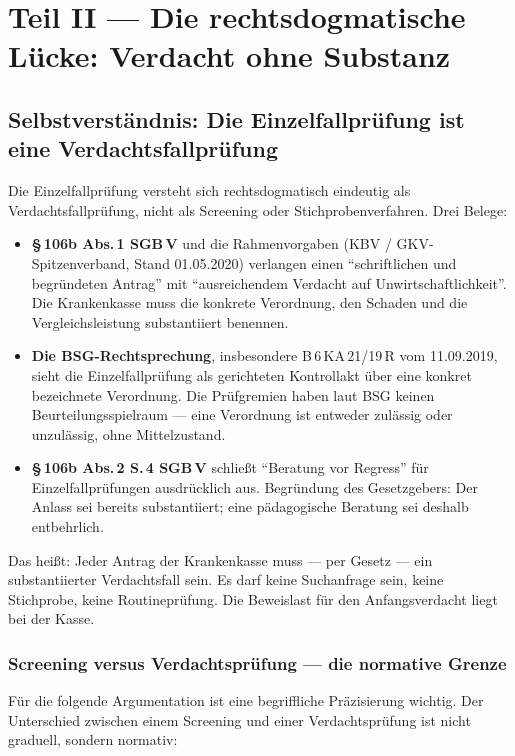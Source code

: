 \documentclass{umbruch-position}
\begin{document}
\section{Teil II --- Die rechtsdogmatische Lücke: Verdacht ohne Substanz}

\subsection{Selbstverständnis: Die Einzelfallprüfung ist eine Verdachtsfallprüfung}

Die Einzelfallprüfung versteht sich rechtsdogmatisch eindeutig als Verdachtsfallprüfung, nicht als Screening oder Stichprobenverfahren. Drei Belege:

\begin{itemize}[nosep]
  \item \textbf{\S\,106b Abs.\,1 SGB\,V} und die Rahmenvorgaben (KBV / GKV-Spitzenverband, Stand 01.05.2020) verlangen einen ``schriftlichen und begründeten Antrag'' mit ``ausreichendem Verdacht auf Unwirtschaftlichkeit''. Die Krankenkasse muss die konkrete Verordnung, den Schaden und die Vergleichsleistung substantiiert benennen.
  \item \textbf{Die BSG-Rechtsprechung}, insbesondere B\,6\,KA\,21/19\,R vom 11.09.2019, sieht die Einzelfallprüfung als gerichteten Kontrollakt über eine konkret bezeichnete Verordnung. Die Prüfgremien haben laut BSG keinen Beurteilungsspielraum --- eine Verordnung ist entweder zulässig oder unzulässig, ohne Mittelzustand.
  \item \textbf{\S\,106b Abs.\,2 S.\,4 SGB\,V} schließt ``Beratung vor Regress'' für Einzelfallprüfungen ausdrücklich aus. Begründung des Gesetzgebers: Der Anlass sei bereits substantiiert; eine pädagogische Beratung sei deshalb entbehrlich.
\end{itemize}

Das heißt: Jeder Antrag der Krankenkasse muss --- per Gesetz --- ein substantiierter Verdachtsfall sein. Es darf keine Suchanfrage sein, keine Stichprobe, keine Routineprüfung. Die Beweislast für den Anfangsverdacht liegt bei der Kasse.

\subsubsection*{Screening versus Verdachtsprüfung — die normative Grenze}

Für die folgende Argumentation ist eine begriffliche Präzisierung wichtig. Der Unterschied zwischen einem Screening und einer Verdachtsprüfung ist nicht graduell, sondern normativ:
\end{document}
